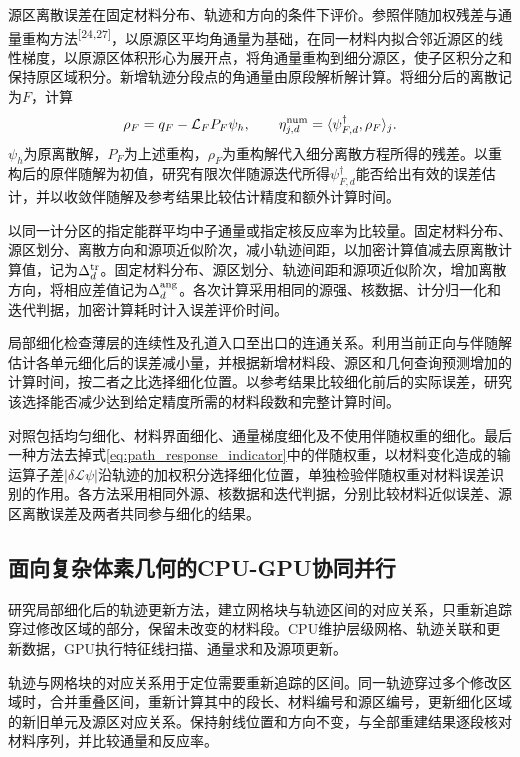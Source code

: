 \documentclass[UTF8, zihao=-4, fontset=none, a4paper]{ctexart}
\newcommand{\upcite}[1]{\textsuperscript{[#1]}}
\begin{document}
源区离散误差在固定材料分布、轨迹和方向的条件下评价。参照伴随加权残差与通量重构方法\upcite{24,27}，以原源区平均角通量为基础，在同一材料内拟合邻近源区的线性梯度，以原源区体积形心为展开点，将角通量重构到细分源区，使子区积分之和保持原区域积分。新增轨迹分段点的角通量由原段解析解计算。将细分后的离散记为$F$，计算
\begin{equation}
\rho_F=q_F-\mathcal L_F P_F\psi_h,
\qquad
\eta^{\rm num}_{j,d}=\langle\psi_{F,d}^\dagger,\rho_F\rangle_j.
\label{eq:independent_residual}
\end{equation}
$\psi_h$为原离散解，$P_F$为上述重构，$\rho_F$为重构解代入细分离散方程所得的残差。以重构后的原伴随解为初值，研究有限次伴随源迭代所得$\psi_{F,d}^\dagger$能否给出有效的误差估计，并以收敛伴随解及参考结果比较估计精度和额外计算时间。

以同一计分区的指定能群平均中子通量或指定核反应率为比较量。固定材料分布、源区划分、离散方向和源项近似阶次，减小轨迹间距，以加密计算值减去原离散计算值，记为$\Delta^{\rm tr}_d$。固定材料分布、源区划分、轨迹间距和源项近似阶次，增加离散方向，将相应差值记为$\Delta^{\rm ang}_d$。各次计算采用相同的源强、核数据、计分归一化和迭代判据，加密计算耗时计入误差评价时间。

局部细化检查薄层的连续性及孔道入口至出口的连通关系。利用当前正向与伴随解估计各单元细化后的误差减小量，并根据新增材料段、源区和几何查询预测增加的计算时间，按二者之比选择细化位置。以参考结果比较细化前后的实际误差，研究该选择能否减少达到给定精度所需的材料段数和完整计算时间。

对照包括均匀细化、材料界面细化、通量梯度细化及不使用伴随权重的细化。最后一种方法去掉式\eqref{eq:path_response_indicator}中的伴随权重，以材料变化造成的输运算子差$|\delta\mathcal L\psi|$沿轨迹的加权积分选择细化位置，单独检验伴随权重对材料误差识别的作用。各方法采用相同外源、核数据和迭代判据，分别比较材料近似误差、源区离散误差及两者共同参与细化的结果。

\subsection{面向复杂体素几何的CPU-GPU协同并行}
研究局部细化后的轨迹更新方法，建立网格块与轨迹区间的对应关系，只重新追踪穿过修改区域的部分，保留未改变的材料段。CPU维护层级网格、轨迹关联和更新数据，GPU执行特征线扫描、通量求和及源项更新。

轨迹与网格块的对应关系用于定位需要重新追踪的区间。同一轨迹穿过多个修改区域时，合并重叠区间，重新计算其中的段长、材料编号和源区编号，更新细化区域的新旧单元及源区对应关系。保持射线位置和方向不变，与全部重建结果逐段核对材料序列，并比较通量和反应率。
\end{document}
